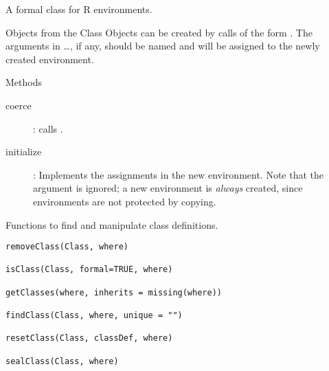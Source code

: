 %
\begin{Description}\relax
 A formal class for R environments.
\end{Description}
%
\begin{Section}{Objects from the Class}
Objects can be created by calls of the form .
The arguments in \dots, if any, should be named and will be assigned to
the newly created environment.
\end{Section}
%
\begin{Section}{Methods}
\begin{description}

\item[coerce] :
calls . 
\item[initialize] :
Implements the assignments in the new environment.  Note that the
 argument is ignored; a new environment is
\emph{always} created, since environments are not protected by copying. 

\end{description}

\end{Section}
%
\begin{SeeAlso}\relax
\end{SeeAlso}
%
\begin{Description}\relax
Functions to find and manipulate class definitions.
\end{Description}
%
\begin{Usage}
\begin{verbatim}
removeClass(Class, where)

isClass(Class, formal=TRUE, where)

getClasses(where, inherits = missing(where))

findClass(Class, where, unique = "")

resetClass(Class, classDef, where)

sealClass(Class, where)

\end{verbatim}
\end{Usage}
